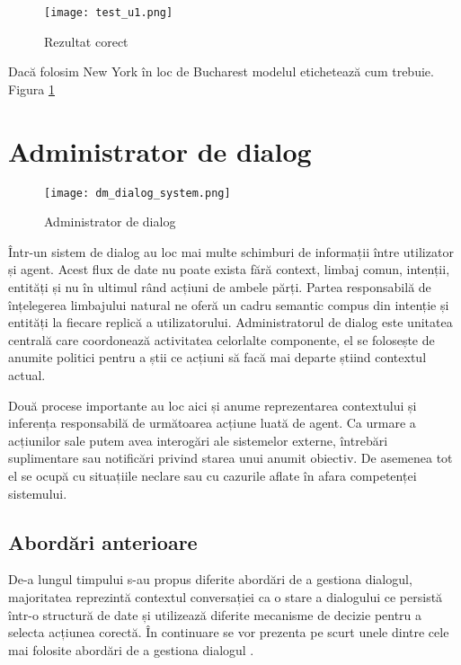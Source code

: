 \begin{figure}[h]
	\centering
	\texttt{[image: test\_u1.png]}
	\caption{Rezultat corect}
	\label{fig:test_u1}
\end{figure}
Dacă folosim {\ttfamily New York} în loc de {\ttfamily Bucharest} modelul etichetează cum trebuie. Figura \ref{fig:test_u1}


\section{Administrator de dialog}
\begin{figure}[h]
	\centering
	\texttt{[image: dm\_dialog\_system.png]}
	\caption{Administrator de dialog}
	\label{fig:dm_ds_proc}
\end{figure}

Într-un sistem de dialog au loc mai multe schimburi de informații între utilizator și agent. Acest flux de date nu poate exista fără context, limbaj comun, intenții, entități și nu în ultimul rând acțiuni de ambele părți. Partea responsabilă de înțelegerea limbajului natural ne oferă un cadru semantic compus din intenție și entități la fiecare replică a utilizatorului. Administratorul de dialog este unitatea centrală care coordonează activitatea celorlalte componente, el se folosește de anumite politici pentru a știi ce acțiuni să facă mai departe știind contextul actual.

Două procese importante au loc aici și anume reprezentarea contextului și inferența responsabilă de următoarea acțiune luată de agent.
Ca urmare a acțiunilor sale putem avea interogări ale sistemelor externe, întrebări suplimentare sau notificări privind starea unui anumit obiectiv.
De asemenea tot el se ocupă cu situațiile neclare sau cu cazurile aflate în afara competenței sistemului.

\subsection{Abordări anterioare}

De-a lungul timpului s-au propus diferite abordări de a gestiona dialogul, majoritatea reprezintă contextul conversației ca o stare a dialogului ce persistă într-o structură de date și utilizează diferite mecanisme de decizie pentru a selecta acțiunea corectă. În continuare se vor prezenta pe scurt unele dintre cele mai folosite abordări de a gestiona dialogul \cite{aniklasson, dm-framework}.

